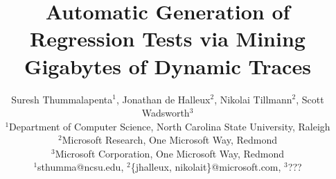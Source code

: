 \documentclass{sig-alternate}
\begin{document}
\title{Automatic Generation of Regression Tests via Mining Gigabytes of Dynamic Traces}
%
%
%
%
%

%

\author{Suresh Thummalapenta$^1$, Jonathan de Halleux$^2$, Nikolai Tillmann$^2$, Scott Wadsworth$^3$\\
\small{$^1$Department of Computer Science, North Carolina State University, Raleigh}\\
\small{$^2$Microsoft Research, One Microsoft Way, Redmond}\\
\small{$^3$Microsoft Corporation, One Microsoft Way, Redmond}\\
\small{$^1$sthumma@ncsu.edu, $^2$\{jhalleux, nikolait\}@microsoft.com}, $^3$???\\
}
\end{document}
